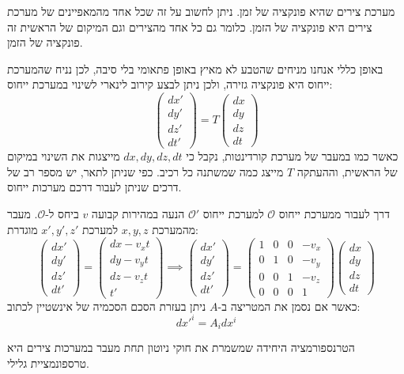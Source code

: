 \documentclass{tstextbook}
\begin{document}
\begin{definition}
מערכת צירים שהיא פונקציה של זמן. ניתן לחשוב על זה שכל אחד מהמאפיינים של מערכת צירים היא פונקציה של הזמן. כלומר גם כל אחד מהצירים וגם המיקום של הראשית זה פונקציה של הזמן.

\end{definition}
באופן כללי אנחנו מניחים שהטבע לא מאיץ באופן פתאומי בלי סיבה, לכן נניח שהמערכת ייחוס היא פונקציה גזירה, ולכן ניתן לבצע קירוב לינארי לשינוי במערכת ייחוס:
$$\begin{pmatrix}dx' \\dy' \\dz' \\dt'\end{pmatrix}=T\begin{pmatrix}dx\\ dy \\ dz \\ dt
\end{pmatrix}$$
כאשר כמו במעבר של מערכת קורדינטות, נקבל כי \(dx,dy,dz,dt\) מייצגות את השינוי במיקום של הראשית, וההעתקה \(T\) מייצג כמה שמשתנה כל רכיב.
כפי שניתן לתאר, יש מספר רב של דרכים שניתן לעבור דרכם מערכות ייחוס. 

\begin{definition}
דרך לעבור ממערכת ייחוס \(\mathcal{O}\) למערכת ייחוס \(\mathcal{O}'\) הנעה במהירות קבועה \(v\) ביחס ל-\(\mathcal{O}\). מעבר מהמערכת \(x,y,z\) למערכת \(x',y',z'\) מוגדרת:
$$\begin{pmatrix}d x' \\d y' \\d  z' \\dt' \end{pmatrix}=\begin{pmatrix}d x-v_{x}t \\d y-v_{y}t \\d z-v_{z}t \\t'\end{pmatrix}\implies \begin{pmatrix}d x' \\d y' \\d z' \\dt'\end{pmatrix}=\begin{pmatrix}1  & 0 & 0 & -v_{x} \\0 & 1 & 0 & -v_{y} \\0 & 0 & 1 & -v_{z} \\0 & 0 & 0 & 1\end{pmatrix}\begin{pmatrix}dx \\dy \\dz  \\dt
\end{pmatrix}$$
כאשר אם נסמן את המטריצה ב-\(A\) ניתן בעזרת הסכם הסכמיה של אינשטיין לכתוב:
$$dx'^i=A_{i}dx^i$$

\end{definition}
\begin{proposition}
הטרנספורמציה היחידה שמשמרת את חוקי ניוטון תחת מעבר במערכות צירים היא טרספונמציית גלילי.

\end{proposition}
\end{document}
